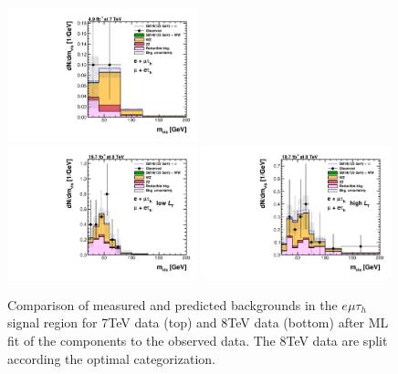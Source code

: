 \begin{figure}
\begin{center}
  \includegraphics[width=0.49\textwidth]{4_Analisys/pics/postfit/emt_postfit_7TeV_FitAllChannels.pdf}\\
  \includegraphics[width=0.49\textwidth]{4_Analisys/pics/postfit/emt_low_postfit_8TeV_FitAllChannels.pdf}
  \includegraphics[width=0.49\textwidth]{4_Analisys/pics/postfit/emt_high_postfit_8TeV_FitAllChannels.pdf}\\
  \caption{Comparison of measured and predicted backgrounds in the $e\mu\tau_h$ signal region for 7TeV data (top) and 8TeV data (bottom) after ML fit of the components to the observed data. The 8TeV data are split according the optimal categorization.}
  \label{fig:LLT_emt_postfit}
\end{center}

\end{figure}
